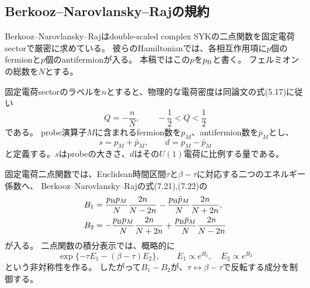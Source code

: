 \documentclass[a4paper,11pt]{ltjsarticle}
\numberwithin{equation}{section}
\begin{document}
\subsection{Berkooz--Narovlansky--Rajの規約}
Berkooz--Narovlansky--Rajはdouble-scaled complex SYKの二点関数を固定電荷sectorで厳密に求めている\cite{BNR}。
彼らのHamiltonianでは、各相互作用項に$p$個のfermionと$p$個のantifermionが入る。
本稿ではこの$p$を$p_{\rm B}$と書く。
フェルミオンの総数を$N$とする。

固定電荷sectorのラベルを$n$とすると、物理的な電荷密度は同論文の式(5.17)に従い
\begin{equation}
 Q=-\frac{n}{N},\qquad -\frac12<Q<\frac12
 \label{eq:Q}
\end{equation}
である。
probe演算子$M$に含まれるfermion数を$p_M$、antifermion数を$\bar p_M$とし、
\begin{equation}
 s=p_M+\bar p_M,\qquad d=p_M-\bar p_M
 \label{eq:sd}
\end{equation}
と定義する。$s$はprobeの大きさ、$d$はその$U(1)$電荷に比例する量である。

固定電荷二点関数では、Euclidean時間区間$\tau$と$\beta-\tau$に対応する二つのエネルギー係数へ、
Berkooz--Narovlansky--Rajの式(7.21),(7.22)の
\begin{align}
 B_1&=\frac{p_{\rm B}p_M}{N}\frac{2n}{N-2n}
 -\frac{p_{\rm B}\bar p_M}{N}\frac{2n}{N+2n},
 \label{eq:B1}\\
 B_2&=-\frac{p_{\rm B}p_M}{N}\frac{2n}{N+2n}
 +\frac{p_{\rm B}\bar p_M}{N}\frac{2n}{N-2n}
 \label{eq:B2}
\end{align}
が入る\cite{BNR}。
二点関数の積分表示では、概略的に
\begin{equation}
 \exp\{-\tau E_1-(\beta-\tau)E_2\},\qquad
 E_1\propto e^{B_1},\quad E_2\propto e^{B_2}
 \label{eq:twosegments}
\end{equation}
という非対称性を作る。
したがって$B_1-B_2$が、$\tau\leftrightarrow\beta-\tau$で反転する成分を制御する。
\end{document}
